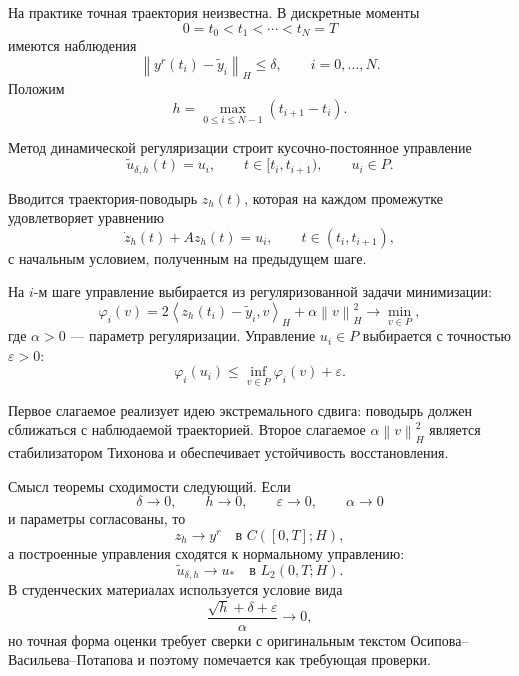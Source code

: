 \documentclass[12pt,a4paper]{article}
\newcommand{\norm}[1]{\left\lVert #1\right\rVert}
\newcommand{\inner}[2]{\left\langle #1,#2\right\rangle}
\begin{document}
На практике точная траектория неизвестна. В дискретные моменты
\[
    0=t_0<t_1<\cdots<t_N=T
\]
имеются наблюдения
\begin{equation}
    \norm{y^r(t_i)-\tilde y_i}_H\le \delta,
    \qquad i=0,\ldots,N.
\end{equation}
Положим
\begin{equation}
    h=\max_{0\le i\le N-1}(t_{i+1}-t_i).
\end{equation}

Метод динамической регуляризации строит кусочно-постоянное управление
\begin{equation}
    \tilde u_{\delta,h}(t)=u_i,
    \qquad t\in[t_i,t_{i+1}),
    \qquad u_i\in P.
\end{equation}

Вводится траектория-поводырь $z_h(t)$, которая на каждом промежутке удовлетворяет уравнению
\begin{equation}
    \dot z_h(t)+Az_h(t)=u_i,
    \qquad t\in(t_i,t_{i+1}),
\end{equation}
с начальным условием, полученным на предыдущем шаге.

На $i$-м шаге управление выбирается из регуляризованной задачи минимизации:
\begin{equation}
    \varphi_i(v)
    =2\inner{z_h(t_i)-\tilde y_i}{v}_H
    +\alpha\norm{v}_H^2
    \to \min_{v\in P},
\end{equation}
где $\alpha>0$ --- параметр регуляризации. Управление $u_i\in P$ выбирается с точностью $\varepsilon>0$:
\begin{equation}
    \varphi_i(u_i)\le \inf_{v\in P}\varphi_i(v)+\varepsilon.
\end{equation}

Первое слагаемое реализует идею экстремального сдвига: поводырь должен сближаться с наблюдаемой траекторией. Второе слагаемое $\alpha\norm{v}_H^2$ является стабилизатором Тихонова и обеспечивает устойчивость восстановления.

Смысл теоремы сходимости следующий. Если
\[
    \delta\to0,
    \qquad h\to0,
    \qquad \varepsilon\to0,
    \qquad \alpha\to0
\]
и параметры согласованы, то
\begin{equation}
    z_h\to y^r \quad\text{в } C([0,T];H),
\end{equation}
а построенные управления сходятся к нормальному управлению:
\begin{equation}
    \tilde u_{\delta,h}\to u_* \quad\text{в } L_2(0,T;H).
\end{equation}
В студенческих материалах используется условие вида
\begin{equation}
    \frac{\sqrt h+\delta+\varepsilon}{\alpha}\to0,
\end{equation}
но точная форма оценки требует сверки с оригинальным текстом Осипова--Васильева--Потапова и поэтому помечается как требующая проверки.
\end{document}

